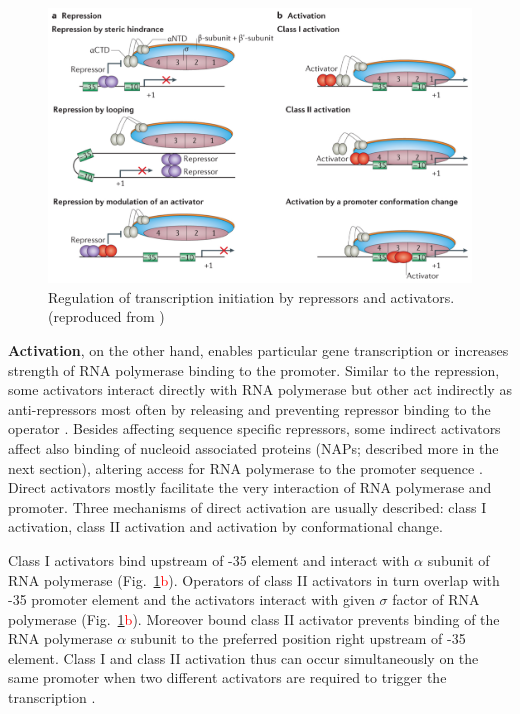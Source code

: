 \begin{figure}[ht!]
  \centering
  \includegraphics[scale=0.4]{text/Pictures/TxnInitRegulation.png}
	\caption{Regulation of transcription initiation by repressors and activators. (reproduced from \cite{browning2016local})}
	\label{txn}
\end{figure}

\textbf{Activation}, on the other hand, enables particular gene transcription or increases strength of RNA polymerase binding to the promoter.
Similar to the repression, some activators interact directly with RNA polymerase but other act indirectly as anti-repressors most often by releasing and preventing repressor binding to the operator \cite{frederix2011co}.
Besides affecting sequence specific repressors, some indirect activators affect also binding of nucleoid associated proteins (NAPs; described more in the next section), altering access for RNA polymerase to the promoter sequence \cite{santana2001transcriptional}.
Direct activators mostly facilitate the very interaction of RNA polymerase and promoter.
Three mechanisms of direct activation are usually described: class I activation, class II activation and activation by conformational change.

Class I activators bind upstream of -35 element and interact with $\alpha$ subunit of RNA polymerase \cite{ushida1990helical} (Fig.~\ref{txn}\textcolor{red}{b}).
Operators of class II activators in turn overlap with -35 promoter element and the activators interact with given $\sigma$ factor of RNA polymerase \cite{igarashi1991functional} (Fig.~\ref{txn}\textcolor{red}{b}).
Moreover bound class II activator prevents binding of the RNA polymerase $\alpha$ subunit to the preferred position right upstream of -35 element.
Class I and class II activation thus can occur simultaneously on the same promoter when two different activators are required to trigger the transcription \cite{lloyd2002requirement}.

